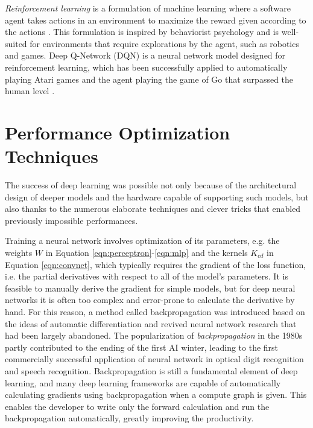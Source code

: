 \emph{Reinforcement learning} is a formulation of machine learning where a software agent takes actions in an environment to maximize the reward given according to the actions \cite{sutton2018reinforcement}.
This formulation is inspired by behaviorist psychology and is well-suited for environments that require explorations by the agent, such as robotics and games.
Deep Q-Network (DQN) \cite{mnih2015dqn} is a neural network model designed for reinforcement learning, which has been successfully applied to automatically playing Atari games \cite{mnih2013atari} and the agent playing the game of Go that surpassed the human level \cite{silver2016alphago}.


\section{Performance Optimization Techniques}

The success of deep learning was possible not only because of the architectural design of deeper models and the hardware capable of supporting such models, but also thanks to the numerous elaborate techniques and clever tricks that enabled previously impossible performances.

Training a neural network involves optimization of its parameters, e.g. the weights $W$ in Equation \ref{eqn:perceptron}-\ref{eqn:mlp} and the kernels $K_{cd}$ in Equation \ref{eqn:convnet}, which typically requires the gradient of the loss function, i.e. the partial derivatives with respect to all of the model's parameters.
It is feasible to manually derive the gradient for simple models, but for deep neural networks it is often too complex and error-prone to calculate the derivative by hand.
For this reason, a method called backpropagation \cite{werbos1982backpropagation, rumelhart1986backpropagation} was introduced based on the ideas of automatic differentiation \cite{linnainmaa1970ad} and revived neural network research that had been largely abandoned.
The popularization of \emph{backpropagation} in the 1980s partly contributed to the ending of the first AI winter, leading to the first commercially successful application of neural network in optical digit recognition and speech recognition.
Backpropagation is still a fundamental element of deep learning, and many deep learning frameworks are capable of automatically calculating gradients using backpropagation when a compute graph is given.
This enables the developer to write only the forward calculation and run the backpropagation automatically, greatly improving the productivity.


